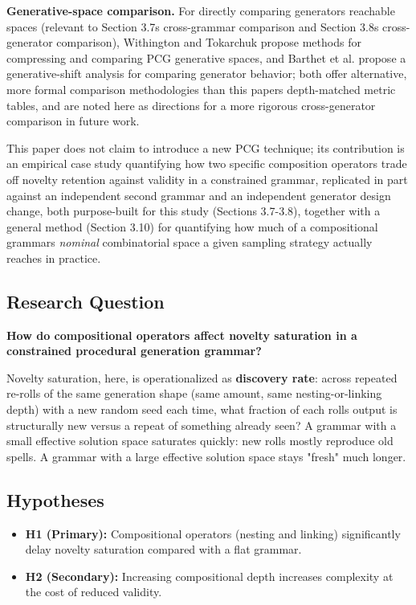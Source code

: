 \documentclass[
  10pt,
  twocolumn]{article}
\providecommand{\tightlist}{%
  \setlength{\itemsep}{0pt}\setlength{\parskip}{0pt}}
\begin{document}
\textbf{Generative-space comparison.} For directly comparing
generators\textquotesingle{} reachable spaces (relevant to Section
3.7\textquotesingle s cross-grammar comparison and Section
3.8\textquotesingle s cross-generator comparison), Withington and
Tokarchuk propose methods for compressing and comparing PCG generative
spaces, and Barthet et al. propose a generative-shift analysis for
comparing generator behavior; both offer alternative, more formal
comparison methodologies than this paper\textquotesingle s depth-matched
metric tables, and are noted here as directions for a more rigorous
cross-generator comparison in future work.

This paper does not claim to introduce a new PCG technique; its
contribution is an empirical case study quantifying how two specific
composition operators trade off novelty retention against validity in a
constrained grammar, replicated in part against an independent second
grammar and an independent generator design change, both purpose-built
for this study (Sections 3.7-3.8), together with a general method
(Section 3.10) for quantifying how much of a compositional
grammar\textquotesingle s \emph{nominal} combinatorial space a given
sampling strategy actually reaches in practice.

\subsection{Research Question}\label{research-question}

\textbf{How do compositional operators affect novelty saturation in a
constrained procedural generation grammar?}

Novelty saturation, here, is operationalized as \textbf{discovery rate}:
across repeated re-rolls of the same generation shape (same amount, same
nesting-or-linking depth) with a new random seed each time, what
fraction of each roll\textquotesingle s output is structurally new
versus a repeat of something already seen? A grammar with a small
effective solution space saturates quickly: new rolls mostly reproduce
old spells. A grammar with a large effective solution space stays
"fresh" much longer.

\subsection{Hypotheses}\label{hypotheses}

\begin{itemize}
\tightlist
\item
  \textbf{H1 (Primary):} Compositional operators (nesting and linking)
  significantly delay novelty saturation compared with a flat grammar.
\item
  \textbf{H2 (Secondary):} Increasing compositional depth increases
  complexity at the cost of reduced validity.
\end{itemize}
\end{document}
